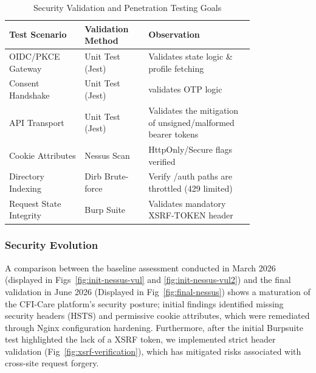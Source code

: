 \begin{table}[ht]
    \centering
    \caption{Security Validation and Penetration Testing Goals}
    \label{tab:security_validation}
    \renewcommand{\arraystretch}{1.3}
    \begin{tabular}{|p{0.25\linewidth}|p{0.2\linewidth}|p{0.35\linewidth}|}
        \hline
        \textbf{Test Scenario} & \textbf{Validation Method} & \textbf{Observation} \\ \hline
        OIDC/PKCE Gateway	& Unit Test (Jest) & Validates state logic \& profile fetching	\\ \hline
        Consent Handshake & Unit Test (Jest) & validates OTP logic \\ \hline
        API Transport & Unit Test (Jest) & Validates the mitigation of unsigned/malformed bearer tokens \\ \hline
        Cookie Attributes & Nessus Scan & HttpOnly/Secure flags verified \\ \hline
        Directory Indexing & Dirb Brute-force & Verify /auth paths are throttled (429 limited) \\ \hline
        Request State Integrity & Burp Suite & Validates mandatory XSRF-TOKEN header \\ \hline
    \end{tabular}
\end{table}

\subsubsection{Security Evolution}
A comparison between the baseline assessment conducted in March 2026 (displayed in Figs~\ref{fig:init-nessus-vul} and \ref{fig:init-nessus-vul2}) and the final validation in June 2026 (Displayed in Fig~\ref{fig:final-nessus}) shows a maturation of the CFI-Care platform's security posture; 
initial findings identified missing security headers (HSTS) and permissive cookie attributes, which were remediated through Nginx configuration hardening. 
Furthermore, after the initial Burpsuite test highlighted the lack of a XSRF token, we implemented strict header validation (Fig~\ref{fig:xsrf-verification}), which has mitigated risks associated with cross-site request forgery.


